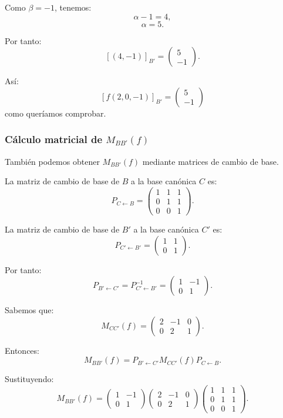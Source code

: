 \documentclass[12pt]{article}
\begin{document}
Como \(\beta=-1\), tenemos:
\[
\alpha-1=4,
\]
\[
\alpha=5.
\]

Por tanto:
\[
[(4,-1)]_{B'}=
\begin{pmatrix}
5\\
-1
\end{pmatrix}.
\]

Así:
\[
\boxed{
[f(2,0,-1)]_{B'}=
\begin{pmatrix}
5\\
-1
\end{pmatrix}
}
\]
como queríamos comprobar.

\subsubsection*{Cálculo matricial de \(M_{BB'}(f)\)}

También podemos obtener \(M_{BB'}(f)\) mediante matrices de cambio de base.

La matriz de cambio de base de \(B\) a la base canónica \(C\) es:
\[
P_{C\leftarrow B}
=
\begin{pmatrix}
1&1&1\\
0&1&1\\
0&0&1
\end{pmatrix}.
\]

La matriz de cambio de base de \(B'\) a la base canónica \(C'\) es:
\[
P_{C'\leftarrow B'}
=
\begin{pmatrix}
1&1\\
0&1
\end{pmatrix}.
\]

Por tanto:
\[
P_{B'\leftarrow C'}=
P_{C'\leftarrow B'}^{-1}
=
\begin{pmatrix}
1&-1\\
0&1
\end{pmatrix}.
\]

Sabemos que:
\[
M_{CC'}(f)=
\begin{pmatrix}
2&-1&0\\
0&2&1
\end{pmatrix}.
\]

Entonces:
\[
M_{BB'}(f)
=
P_{B'\leftarrow C'}M_{CC'}(f)P_{C\leftarrow B}.
\]

Sustituyendo:
\[
M_{BB'}(f)
=
\begin{pmatrix}
1&-1\\
0&1
\end{pmatrix}
\begin{pmatrix}
2&-1&0\\
0&2&1
\end{pmatrix}
\begin{pmatrix}
1&1&1\\
0&1&1\\
0&0&1
\end{pmatrix}.
\]
\end{document}
